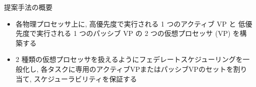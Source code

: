 \begin{frame}{提案手法の概要}
    \begin{itemize}
        \item 各物理プロセッサ上に,  高優先度で実行される 1 つのアクティブ VP と 低優先度で実行される 1 つのパッシブ VP の 2 つの仮想プロセッサ (VP) を構築する
        \item 2 種類の仮想プロセッサを扱えるようにフェデレートスケジューリングを一般化し, 各タスクに専用のアクティブVPまたはパッシブVPのセットを割り当て, スケジューラビリティを保証する
    \end{itemize}
\end{frame}
